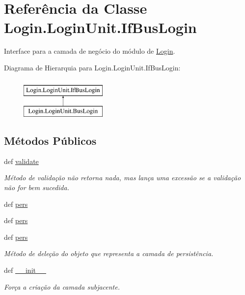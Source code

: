 \hypertarget{classLogin_1_1LoginUnit_1_1IfBusLogin}{\section{Referência da Classe Login.\-Login\-Unit.\-If\-Bus\-Login}
\label{classLogin_1_1LoginUnit_1_1IfBusLogin}
}


Interface para a camada de negócio do módulo de \hyperlink{namespaceLogin}{Login}.  


Diagrama de Hierarquia para Login.\-Login\-Unit.\-If\-Bus\-Login\-:\begin{figure}[H]
\begin{center}
\leavevmode
\includegraphics[height=2.000000cm]{dc/dd6/classLogin_1_1LoginUnit_1_1IfBusLogin}
\end{center}
\end{figure}
\subsection*{Métodos Públicos}
\begin{DoxyCompactItemize}
\item 
def \hyperlink{classLogin_1_1LoginUnit_1_1IfBusLogin_a55078e3d16b3e0557b557aed92fd7c36}{validate}
\begin{DoxyCompactList}\small\item\em Método de validação não retorna nada, mas lança uma excessão se a validação não for bem sucedida. \end{DoxyCompactList}\item 
def \hyperlink{classLogin_1_1LoginUnit_1_1IfBusLogin_a807b0a5d5bdae58087feb9d810a6538d}{pers}
\item 
def \hyperlink{classLogin_1_1LoginUnit_1_1IfBusLogin_a807b0a5d5bdae58087feb9d810a6538d}{pers}
\item 
def \hyperlink{classLogin_1_1LoginUnit_1_1IfBusLogin_a807b0a5d5bdae58087feb9d810a6538d}{pers}
\begin{DoxyCompactList}\small\item\em Método de deleção do objeto que representa a camada de persistência. \end{DoxyCompactList}\item 
def \hyperlink{classLogin_1_1LoginUnit_1_1IfBusLogin_a974c8e8520b02844836d9c7a8e06379b}{\-\_\-\-\_\-init\-\_\-\-\_\-}
\begin{DoxyCompactList}\small\item\em Força a criação da camada subjacente. \end{DoxyCompactList}\end{DoxyCompactItemize}

